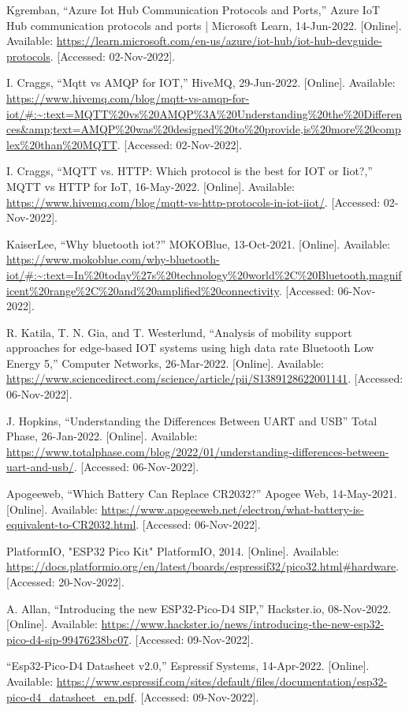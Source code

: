 \begin{thebibliography}{00}
     Kgremban, “Azure Iot Hub Communication Protocols and Ports,” Azure IoT Hub communication protocols and ports | Microsoft Learn, 14-Jun-2022. [Online]. Available: \url{https://learn.microsoft.com/en-us/azure/iot-hub/iot-hub-devguide-protocols}. [Accessed: 02-Nov-2022]. 

     I. Craggs, “Mqtt vs AMQP for IOT,” HiveMQ, 29-Jun-2022. [Online]. Available: \url{https://www.hivemq.com/blog/mqtt-vs-amqp-for-iot/#:~:text=MQTT%20vs%20AMQP%3A%20Understanding%20the%20Differences&amp;text=AMQP%20was%20designed%20to%20provide,is%20more%20complex%20than%20MQTT}. [Accessed: 02-Nov-2022]. 
    
     I. Craggs, “MQTT vs. HTTP: Which protocol is the best for IOT or Iiot?,” MQTT vs HTTP for IoT, 16-May-2022. [Online]. Available: \url{https://www.hivemq.com/blog/mqtt-vs-http-protocols-in-iot-iiot/}. [Accessed: 02-Nov-2022]. 
    
     KaiserLee, “Why bluetooth iot?” MOKOBlue, 13-Oct-2021. [Online]. Available: \url{https://www.mokoblue.com/why-bluetooth-iot/#:~:text=In%20today%27s%20technology%20world%2C%20Bluetooth,magnificent%20range%2C%20and%20amplified%20connectivity}. [Accessed: 06-Nov-2022]. 
    
     R. Katila, T. N. Gia, and T. Westerlund, “Analysis of mobility support approaches for edge-based IOT systems using high data rate Bluetooth Low Energy 5,” Computer Networks, 26-Mar-2022. [Online]. Available: \url{https://www.sciencedirect.com/science/article/pii/S1389128622001141}. [Accessed: 06-Nov-2022].
    
     J. Hopkins, “Understanding the Differences Between UART and USB” Total Phase, 26-Jan-2022. [Online]. Available: \url{https://www.totalphase.com/blog/2022/01/understanding-differences-between-uart-and-usb/}. [Accessed: 06-Nov-2022].

     Apogeeweb, “Which Battery Can Replace CR2032?” Apogee Web, 14-May-2021. [Online]. Available: \url{https://www.apogeeweb.net/electron/what-battery-is-equivalent-to-CR2032.html}. [Accessed: 06-Nov-2022].
    
     PlatformIO, "ESP32 Pico Kit" PlatformIO, 2014. [Online]. Available: \url{https://docs.platformio.org/en/latest/boards/espressif32/pico32.html#hardware}. [Accessed: 20-Nov-2022].

     A. Allan, “Introducing the new ESP32-Pico-D4 SIP,” Hackster.io, 08-Nov-2022. [Online]. Available: \url{https://www.hackster.io/news/introducing-the-new-esp32-pico-d4-sip-99476238bc07}. [Accessed: 09-Nov-2022]. 
    
    “Esp32-Pico-D4 Datasheet v2.0,” Espressif Systems, 14-Apr-2022. [Online]. Available: \url{https://www.espressif.com/sites/default/files/documentation/esp32-pico-d4_datasheet_en.pdf}. [Accessed: 09-Nov-2022]. 

\end{thebibliography}